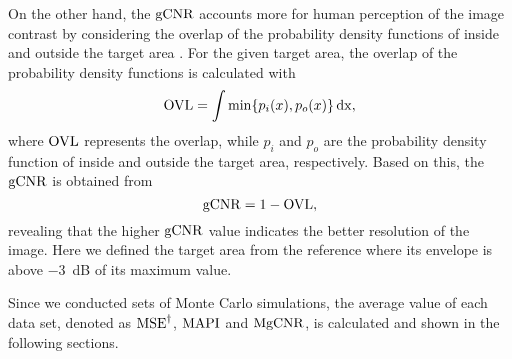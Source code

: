 On the other hand, the $\operatorname{gCNR}$ accounts more for human perception of the image contrast by considering the overlap of the probability density functions of inside and outside the target area \cite{Molares19GCNR}. %
For the given target area, the overlap of the probability density functions is calculated with
\begin{equation} \label{eq:OVL}
	\OVL = \int \min \{ p_i (x), p_o (x) \} \dx,
\end{equation} 
where $\operatorname{OVL}$ represents the overlap, while $p_i$ and $p_o$ are the probability density function of inside and outside the target area, respectively. Based on this, the $\operatorname{gCNR}$ is obtained from
\begin{equation} \label{eq:GCNR}
	\GCNR = 1 - \OVL,
\end{equation}
revealing that the higher $\operatorname{gCNR}$ value indicates the better resolution of the image. Here we defined the target area from the reference where its envelope is above \SI{-3}{\deci \bel} of its maximum value.\par

Since we conducted sets of Monte Carlo simulations, the average value of each data set, denoted as $\operatorname{MSE}^{\dagger}$, $\operatorname{MAPI}$ and $\operatorname{MgCNR}$, is calculated and shown in the following sections. 
